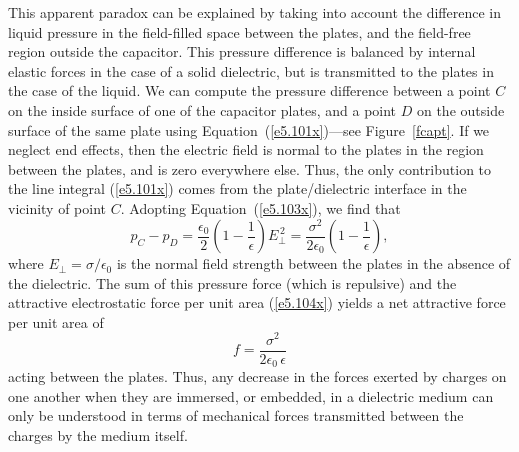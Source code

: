 This apparent paradox can be explained by taking into account the
difference in liquid pressure in the field-filled space
between the plates, and the field-free region outside the capacitor. 
This pressure difference is balanced by internal elastic forces in the case
of a solid dielectric, but is transmitted to the
plates in the case of the liquid. We can compute the pressure difference
between a point $C$ on the inside surface of one of the capacitor
plates, and a point $D$ on the outside surface of the same plate using
Equation~(\ref{e5.101x})---see Figure~\ref{fcapt}. If we neglect end effects, then the electric field is normal
to the plates in the region between the plates, and is zero
everywhere else. Thus, the only contribution to the line integral
(\ref{e5.101x}) comes from the plate/dielectric interface in the vicinity of
point $C$. Adopting Equation~(\ref{e5.103x}), we find that
\begin{equation}
p_C- p_D = \frac{\epsilon_0}{2}\left(1-\frac{1}{\epsilon}\right)
E_\perp^{\,2} = \frac{\sigma^2}{2\epsilon_0}\left(1-\frac{1}{\epsilon}\right),
\end{equation}
where $E_\perp=\sigma/\epsilon_0$ is the normal field strength between the plates in
the absence of the dielectric. The sum of this pressure force (which is repulsive) and
the attractive electrostatic force per unit area (\ref{e5.104x}) yields a net attractive
force per unit area of
\begin{equation}
f= \frac{\sigma^2}{2\epsilon_0\,\epsilon}
\end{equation}
acting between the plates. Thus, any decrease in the forces exerted
by charges on one another
when they are immersed, or embedded, in a dielectric medium
can only be understood in terms of mechanical forces transmitted
between the charges by the medium itself. 

